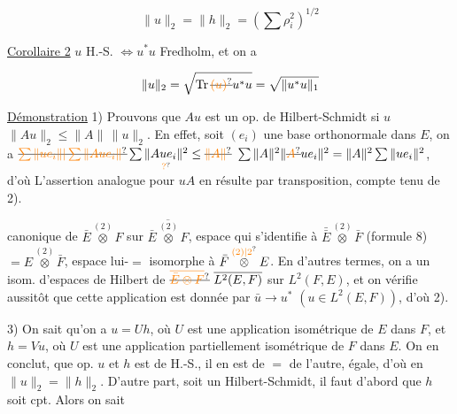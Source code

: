 \[
\boxed{\|u\|_2=\|h\|_2=(\sum\rho_i^2)^{1/2}} \tag*{(19)}
\]



\uline{Corollaire 2} $u$ H.-S. $\Longleftrightarrow u^*u$ Fredholm, et on a

\[
\|u\|_2=\sqrt{\operatorname{Tr}\deleted{\unsure{(u)}}u^*u}=\sqrt{\|u^*u\|_1}
\]

\uline{Démonstration}  1) Prouvons  que $Au$ est
un op. de Hilbert-Schmidt si $u$  
$\|Au\|_2\leq\|A\|\,\|u\|_2$. En effet, soit $(e_i)$ une base orthonormale
dans $E$, on a $\deleted{\unsure{\sum\|ue_i\||\sum\|Aue_i\|}}\sum\underset{\unsure{?}}{\|Aue_i\|^2}\leq\deleted{\unsure{\|A\|}}$
$\sum\|A\|^2\|\deleted{\unsure{A}}ue_i\|^2=\|A\|^2\sum\|ue_i\|^2$, d'où  
L'assertion analogue pour $uA$ en résulte par transposition,
compte tenu de 2).

 
canonique de $\bar E\overset{(2)}{\otimes}F$ sur $\overline{\bar E\overset{(2)}{\otimes}F}$, espace
qui  s'identifie à $\bar{\bar E}\overset{(2)}{\otimes}\bar F$ (formule 8)
$=E\overset{(2)}{\otimes}\bar F$,  espace lui-$=$  isomorphe
à $\bar F\overset{\unsure{(2)|2}}{\otimes}E$.  En d'autres termes, on a
un  isom. d'espaces de Hilbert de
$\deleted{\unsure{\overline{\bar E\otimes F}}}\ \overline{L^2(E,F)}$ sur $L^2(F,E)$, et on vérifie
aussitôt que  cette application est donnée
par $\bar u\to u^*$ $(u\in L^2(E,F))$, d'où 2).

3) On sait qu'on a $u=Uh$, où $U$ est
une application  isométrique de $E$ dans $F$,
et $h=Vu$, où $U$ est une application partiellement
isométrique de $F$ dans $E$. On en conclut,  
  que   op.  $u$
et $h$ est de H.-S., il en est de $=$ de
l'autre,  
égale, d'où en   $\|u\|_2=\|h\|_2$.  D'autre
  
part,  soit un Hilbert-Schmidt, il
faut d'abord que $h$ soit cpt. Alors on sait

